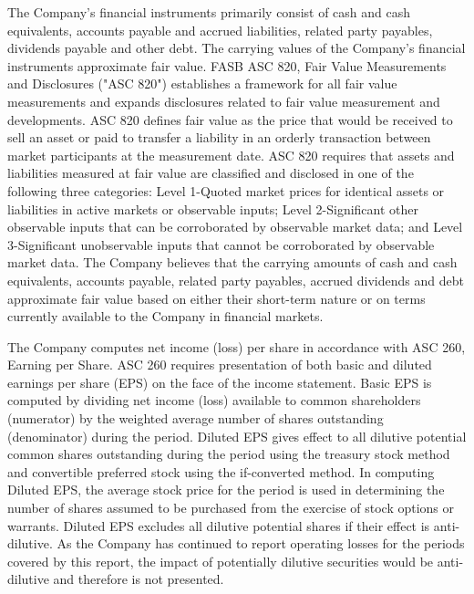 \documentclass[11pt,a4paper]{article}
\begin{document}
The Company's financial instruments primarily consist of cash and cash equivalents, accounts payable and accrued liabilities, related party payables, dividends payable and other debt. The carrying values of the Company's financial instruments approximate fair value. FASB ASC 820, Fair Value Measurements and Disclosures ("ASC 820") establishes a framework for all fair value measurements and expands disclosures related to fair value measurement and developments. ASC 820 defines fair value as the price that would be received to sell an asset or paid to transfer a liability in an orderly transaction between market participants at the measurement date. ASC 820 requires that assets and liabilities measured at fair value are classified and disclosed in one of the following three categories: Level 1-Quoted market prices for identical assets or liabilities in active markets or observable inputs; Level 2-Significant other observable inputs that can be corroborated by observable market data; and Level 3-Significant unobservable inputs that cannot be corroborated by observable market data. The Company believes that the carrying amounts of cash and cash equivalents, accounts payable, related party payables, accrued dividends and debt approximate fair value based on either their short-term nature or on terms currently available to the Company in financial markets.

The Company computes net income (loss) per share in accordance with ASC 260, Earning per Share. ASC 260 requires presentation of both basic and diluted earnings per share (EPS) on the face of the income statement. Basic EPS is computed by dividing net income (loss) available to common shareholders (numerator) by the weighted average number of shares outstanding (denominator) during the period. Diluted EPS gives effect to all dilutive potential common shares outstanding during the period using the treasury stock method and convertible preferred stock using the if-converted method. In computing Diluted EPS, the average stock price for the period is used in determining the number of shares assumed to be purchased from the exercise of stock options or warrants. Diluted EPS excludes all dilutive potential shares if their effect is anti-dilutive. As the Company has continued to report operating losses for the periods covered by this report, the impact of potentially dilutive securities would be anti-dilutive and therefore is not presented.
\end{document}
